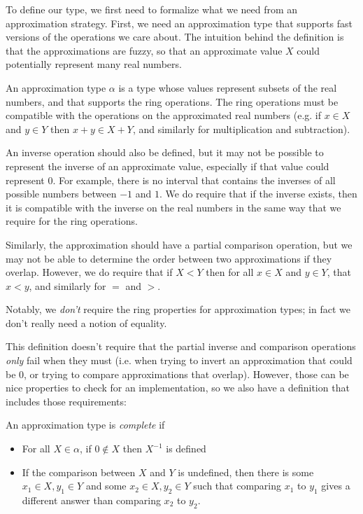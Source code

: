 To define our  type, we first need to formalize what we need
from an approximation strategy. First, we need an approximation type that
supports fast versions of the operations we care about. The intuition behind the
definition is that the approximations are fuzzy, so that an approximate value
$X$ could potentially represent many real numbers.
\begin{definition}
  \label{def:realApprox}
  \leanok
  An approximation type $α$ is a type whose values represent subsets of the real
  numbers, and that supports the ring operations. The ring operations must be
  compatible with the operations on the approximated real numbers (e.g. if $x ∈
  X$ and $y ∈ Y$ then $x + y ∈ X + Y$, and similarly for
  multiplication and subtraction).

  An inverse operation should also be defined, but it may not be possible to
  represent the inverse of an approximate value, especially if that value could
  represent 0. For example, there is no interval that contains the inverses of
  all possible numbers between $-1$ and $1$. We do require that if the inverse
  exists, then it is compatible with the inverse on the real numbers in the same
  way that we require for the ring operations.

  Similarly, the approximation should have a partial comparison operation, but
  we may not be able to determine the order between two approximations if they
  overlap. However, we do require that if $X < Y$ then for all $x ∈
  X$ and $y ∈ Y$, that $x < y$, and similarly for $=$ and $>$.
\end{definition}
Notably, we \emph{don't} require the ring properties for approximation types; in
fact we don't really need a notion of equality.

This definition doesn't require that the partial inverse and comparison
operations \emph{only} fail when they must (i.e. when trying to invert an
approximation that could be 0, or trying to compare approximations that
overlap). However, those can be nice properties to check for an implementation,
so we also have a definition that includes those requirements:

\begin{definition}
  \label{def:completeApprox}
  \leanok
  An approximation type is \emph{complete} if \begin{itemize}
    \item For all $X ∈ α$, if $0 \notin X$ then $X^{-1}$ is defined
    \item If the comparison between $X$ and $Y$ is undefined, then there is
      some $x_1 ∈ X, y_1 ∈ Y$ and some $x_2 ∈ X, y_2 ∈ Y$ such that
      comparing $x_1$ to $y_1$ gives a different answer than comparing $x_2$ to
      $y_2$.
  \end{itemize}
\end{definition}

